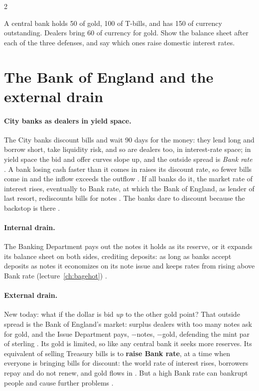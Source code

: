 \begin{paracol}{2}
\begin{exercise}
A central bank holds 50 of gold, 100 of T-bills, and has 150 of currency outstanding. Dealers bring 60 of currency for gold. Show the balance sheet after each of
the three defenses, and say which ones raise domestic interest rates.
\end{exercise}

\section{The Bank of England and the external drain}\label{sec:gl-boe}

\paragraph{City banks as dealers in yield space.} The City banks discount bills and wait 90 days for the money: they lend long and borrow short, take liquidity
risk, and so are dealers too, in interest-rate space; in yield space the bid and offer curves slope up, and the outside spread is \emph{Bank rate}
. A bank losing cash faster than it comes in raises its discount rate, so fewer
bills come in and the inflow exceeds the outflow . If all banks do it, the market rate of interest rises,
eventually to Bank rate, at which the Bank of England, as lender of last resort, rediscounts bills for notes .
The banks dare to discount because the backstop is there .

\paragraph{Internal drain.} The Banking Department pays out the notes it holds as its reserve, or it expands its balance sheet on both sides, crediting deposits:
as long as banks accept deposits as notes it economizes on its note issue and keeps rates from rising above Bank rate (lecture~\ref{ch:bagehot})
.

\paragraph{External drain.} New today: what if the dollar is bid \emph{up} to the other gold point? That outside spread is the Bank of England's market: surplus
dealers with too many notes ask for gold, and the Issue Department pays, $-$notes, $-$gold, defending the mint par of sterling
. Its gold is limited, so like any central bank it seeks more reserves. Its equivalent
of selling Treasury bills is to \textbf{raise Bank rate}, at a time when everyone is bringing bills for discount: the world rate of interest rises, borrowers
repay and do not renew, and gold flows in . But a high Bank rate can bankrupt people and cause
further problems .


\end{paracol}
